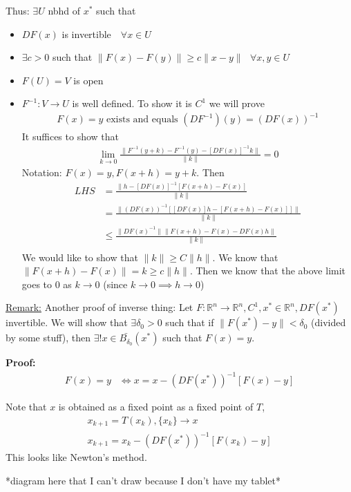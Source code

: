 \documentclass{article}
\newcommand*{\txt}[1]{\text{ #1 }}%
\newcommand*{\fora}{\txt{}\forall}%
\newcommand*{\rr}{\mathbb{R}}%
\begin{document}
Thus: $\exists U$ nbhd of $x^{*}$ such that \begin{itemize}
    \item $DF(x)$ is invertible $\fora x\in U$
    \item $\exists c>0$ such that $\|F(x)-F(y)\|\geq c\|x-y\|\fora x,y\in U$
    \item $F(U)=V$ is open
    \item $F^{-1}:V\to U$ is well defined. To show it is $C^1$ we will prove \begin{align*}
        F(x)=y\txt{exists and equals}(DF^{-1})(y)=(DF(x))^{-1}
    \end{align*} It suffices to show that \begin{align*}
        \lim_{k\to 0}\frac{\|F^{-1}(y+k)-F^{-1}(y)-[DF(x)]^{-1}k\|}{\|k\|}=0
    \end{align*}
    Notation: $F(x)=y, F(x+h)=y+k$. Then \begin{align*}
        LHS&=\frac{\|h-[DF(x)]^{-1}[F(x+h)-F(x)]}{\|k\|}\\
        &=\frac{\|(DF(x))^{-1}[[DF(x)]h-[F(x+h)-F(x)]]\|}{\|k\|}\\
        &\leq \frac{\|DF(x)^{-1}\|\|F(x+h)-F(x)-DF(x)h\|}{\|k\|}\\
    \end{align*}
    We would like to show that $\|k\|\geq C\|h\|$. We know that $\|F(x+h)-F(x)\|=k\geq c\|h\|$. Then we know that the above limit goes to 0 as $k\to 0$ (since $k\to 0\implies h\to 0$)
\end{itemize}

\underline{Remark:} Another proof of inverse thing: Let $F:\rr^n\to \rr^n, C^1, x^{*}\in \rr^n, DF(x^{*})$ invertible. We will show that $\exists \delta_0>0$ such that if $\|F(x^{*})-y\|<\delta_0$ (divided by some stuff), then $\exists! x\in \bar{B_{\delta_0}}(x^{*})$ such that $F(x)=y$. 

\textbf{Proof:} \begin{align*}
    F(x)=y&\iff x=x-(DF(x^{*}))^{-1}[F(x)-y]
\end{align*}

Note that $x$ is obtained as a fixed point as a fixed point of $T$, \begin{align*}
    x_{k+1}=T(x_k),\{x_k\}\to x\\ 
    x_{k+1}=x_k-(DF(x^{*}))^{-1}[F(x_k)-y]
\end{align*} This looks like Newton's method.

*diagram here that I can't draw because I don't have my tablet*
\end{document}
